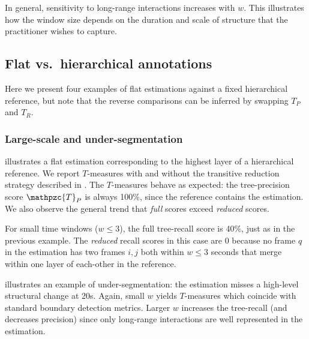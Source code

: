 \documentclass{article}
\def\shag{\ensuremath{\mathpzc{T}}}
\begin{document}
In general, sensitivity to long-range interactions increases with $w$.
This illustrates how the window size depends on the duration and scale of structure
that the practitioner wishes to capture.

\subsection{Flat vs.\ hierarchical annotations}

Here we present four examples of flat estimations against a fixed hierarchical reference, but note that the
reverse comparisons can be inferred by swapping $T_P$ and $T_R$.

\subsubsection{Large-scale and under-segmentation}
\label{sec:largeover}

 illustrates a flat estimation corresponding to the highest layer of 
a hierarchical reference.
We report $T$-measures with and without the transitive reduction strategy described in
.  The $T$-measures behave as expected: the tree-precision score
$\shag_P$ is always 100\%, since the reference contains the estimation.
We also observe the general trend that \emph{full} scores exceed 
\emph{reduced} scores.

For small time windows ($w \leq 3$), the full tree-recall score is 40\%, just as in the previous example.
The \emph{reduced} recall scores in this case are 0 because no frame $q$ in the
estimation has two frames $i, j$ both within $w \leq 3$ seconds that merge within one layer of each-other in the reference. 


 illustrates an example of under-segmentation: the estimation misses a high-level structural change at 20s.  
Again, small $w$ yields $T$-measures which coincide with standard boundary detection metrics.
Larger $w$ increases the tree-recall (and decreases precision)
since only long-range interactions are well represented in the estimation.
\end{document}
